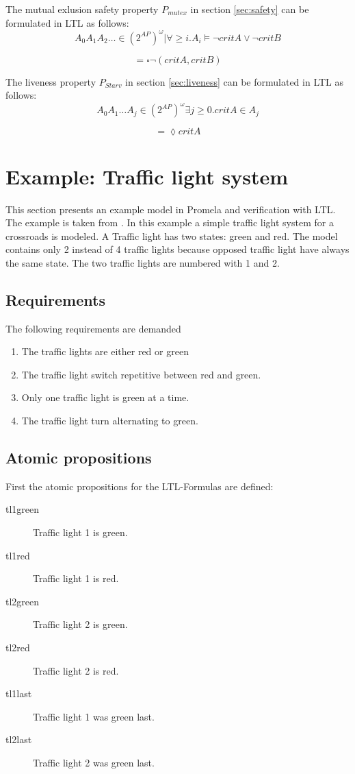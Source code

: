 \documentclass[12pt,a4paper,twoside]{article}
\begin{document}
The mutual exlusion safety property $P_{mutex}$ in section \ref{sec:safety} can be formulated in LTL as follows:
\[
  {A_0 A_1 A_2 \dots \in (2^{AP})^{\omega} | \forall \geq i.   A_i \models \neg critA \lor \neg critB}
\]

\[
= \square \neg (critA,critB)
\]

The liveness property $P_{Starv}$ in section \ref{sec:liveness} can be formulated in LTL as follows:
\[
 { A_0 A_1 \dots A_j \in (2^{AP})^{\omega} \exists j \geq 0. critA \in A_j}
\]

\[
= \lozenge critA
\]

\section{Example: Traffic light system}
\label{sec:example}

This section presents an example model in Promela and verification with LTL. The example is taken from \cite{kleuker09}. In this example a simple traffic light system for a crossroads is modeled. A Traffic light has two states: green and red. The model contains only 2 instead of 4 traffic lights because opposed traffic light have always the same state. The two traffic lights are numbered with 1 and 2.

\subsection{Requirements}
\label{sec:requirements}

The following requirements are demanded
\begin{enumerate}
\item The traffic lights are either red or green
\item The traffic light switch repetitive between red and green.
\item Only one traffic light is green at a time.
\item The traffic light turn alternating to green.
\end{enumerate}

\subsection{Atomic propositions}
\label{sec:trafficlightap}

First the atomic propositions for the LTL-Formulas are defined:

\begin{description}
\item[tl1green] Traffic light 1 is green.
\item[tl1red] Traffic light 1 is red.
\item[tl2green] Traffic light 2 is green.
\item[tl2red] Traffic light 2 is red.
\item[tl1last] Traffic light 1 was green last.
\item[tl2last] Traffic light 2 was green last.
\end{description}
\end{document}
